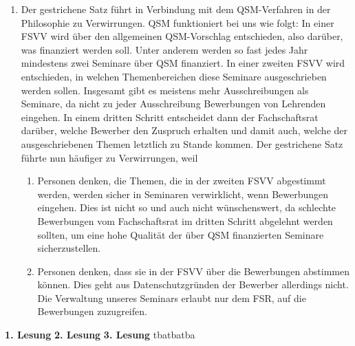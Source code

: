 {\begin{enumerate}
\begin{enumerate}
                    \item Der gestrichene Satz führt in Verbindung mit dem QSM-Verfahren in der Philosophie zu Verwirrungen. QSM funktioniert bei uns wie folgt:
                    In einer FSVV wird über den allgemeinen QSM-Vorschlag entschieden, also darüber, was finanziert werden soll. Unter anderem werden so fast jedes Jahr mindestens zwei Seminare über QSM finanziert.
                    In einer zweiten FSVV wird entschieden, in welchen Themenbereichen diese Seminare ausgeschrieben werden sollen. Insgesamt gibt es meistens mehr Ausschreibungen als Seminare, da nicht zu jeder Ausschreibung Bewerbungen von Lehrenden eingehen.
                    In einem dritten Schritt entscheidet dann der Fachschaftsrat darüber, welche Bewerber den Zuspruch erhalten und damit auch, welche der ausgeschriebenen Themen letztlich zu Stande kommen.
                    Der gestrichene Satz führte nun häufiger zu Verwirrungen, weil 
                    \begin{enumerate}
                        \item Personen denken, die Themen, die in der zweiten FSVV abgestimmt werden, werden sicher in Seminaren verwirklicht, wenn Bewerbungen eingehen. Dies ist nicht so und auch nicht wünschenswert, da schlechte Bewerbungen vom Fachschaftsrat im dritten Schritt abgelehnt werden sollten, um eine hohe Qualität der über QSM finanzierten Seminare sicherzustellen.
                        \item Personen denken, dass sie in der FSVV über die Bewerbungen abstimmen können. Dies geht aus Datenschutzgründen der Bewerber allerdings nicht. Die Verwaltung unseres Seminars erlaubt nur dem FSR, auf die Bewerbungen zuzugreifen.
                    \end{enumerate}
                \end{enumerate} 
        \end{enumerate}
    }{
        \textbf{1. Lesung}
        \ul{}
        \textbf{2. Lesung}
        \ul{}
        \textbf{3. Lesung}
        \ul{}
    }{tba}{tba}{tba}

